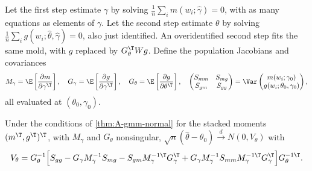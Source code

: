 Let the first step estimate $\gamma$ by solving $\frac{1}{n}\sum_im(w_i;\hat\gamma) = 0$, with as many equations as elements
of $\gamma$. Let the second step estimate $\theta$ by solving $\frac{1}{n}\sum_ig(w_i;\hat\theta, \hat\gamma) = 0$, also just
identified. An overidentified second step fits the same mold, with $g$ replaced by $G_\theta^\T Wg$. Define the population
Jacobians and covariances
\begin{equation*}
  M_\gamma = \E\left[\frac{\partial m}{\partial\gamma^\T}\right],\quad
  G_\gamma = \E\left[\frac{\partial g}{\partial\gamma^\T}\right],\quad
  G_\theta = \E\left[\frac{\partial g}{\partial\theta^\T}\right],\quad
  \begin{pmatrix} S_{mm} & S_{mg} \\ S_{gm} & S_{gg}\end{pmatrix} = \Var\begin{pmatrix} m(w_i;\gamma_0) \\
  g(w_i;\theta_0, \gamma_0)\end{pmatrix},
\end{equation*}
all evaluated at $(\theta_0, \gamma_0)$.

\begin{proposition}\label{prop:A-twostep}
Under the conditions of \cref{thm:A-gmm-normal} for the stacked moments $(m^\T, g^\T)^\T$, with $M_\gamma$ and $G_\theta$
nonsingular, $\sqrt{n}(\hat\theta - \theta_0) \xrightarrow{d} N(0, V_\theta)$ with
\begin{equation}\label{eq:A-twostep-var}
  V_\theta = G_\theta^{-1}\Big[S_{gg} - G_\gamma M_\gamma^{-1}S_{mg} - S_{gm}M_\gamma^{-1\T}G_\gamma^\T
  + G_\gamma M_\gamma^{-1}S_{mm}M_\gamma^{-1\T}G_\gamma^\T\Big]G_\theta^{-1\T}.
\end{equation}
\end{proposition}

